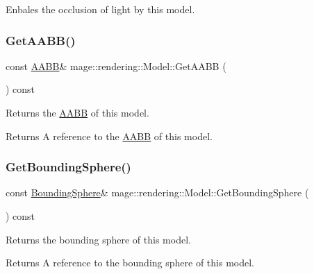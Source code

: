 Enbales the occlusion of light by this model. \hypertarget{classmage_1_1rendering_1_1_model_a05a767ef1551aa4c09c223d8f2311855}{}\label{classmage_1_1rendering_1_1_model_a05a767ef1551aa4c09c223d8f2311855} 
\subsubsection{\texorpdfstring{Get\+A\+A\+B\+B()}{GetAABB()}}
{\footnotesize\ttfamily const \hyperlink{classmage_1_1_a_a_b_b}{A\+A\+BB}\& mage\+::rendering\+::\+Model\+::\+Get\+A\+A\+BB (\begin{DoxyParamCaption}{ }\end{DoxyParamCaption}) const\hspace{0.3cm}{\ttfamily [noexcept]}}

Returns the \hyperlink{classmage_1_1_a_a_b_b}{A\+A\+BB} of this model.

\begin{DoxyReturn}{Returns}
A reference to the \hyperlink{classmage_1_1_a_a_b_b}{A\+A\+BB} of this model. 
\end{DoxyReturn}
\hypertarget{classmage_1_1rendering_1_1_model_a8885748932b52ec2d5bde368db6a130d}{}\label{classmage_1_1rendering_1_1_model_a8885748932b52ec2d5bde368db6a130d} 
\subsubsection{\texorpdfstring{Get\+Bounding\+Sphere()}{GetBoundingSphere()}}
{\footnotesize\ttfamily const \hyperlink{classmage_1_1_bounding_sphere}{Bounding\+Sphere}\& mage\+::rendering\+::\+Model\+::\+Get\+Bounding\+Sphere (\begin{DoxyParamCaption}{ }\end{DoxyParamCaption}) const\hspace{0.3cm}{\ttfamily [noexcept]}}

Returns the bounding sphere of this model.

\begin{DoxyReturn}{Returns}
A reference to the bounding sphere of this model. 
\end{DoxyReturn}
\hypertarget{classmage_1_1rendering_1_1_model_af6e23f8327e82af4d6c2aa854329608c}{}\label{classmage_1_1rendering_1_1_model_af6e23f8327e82af4d6c2aa854329608c} 
